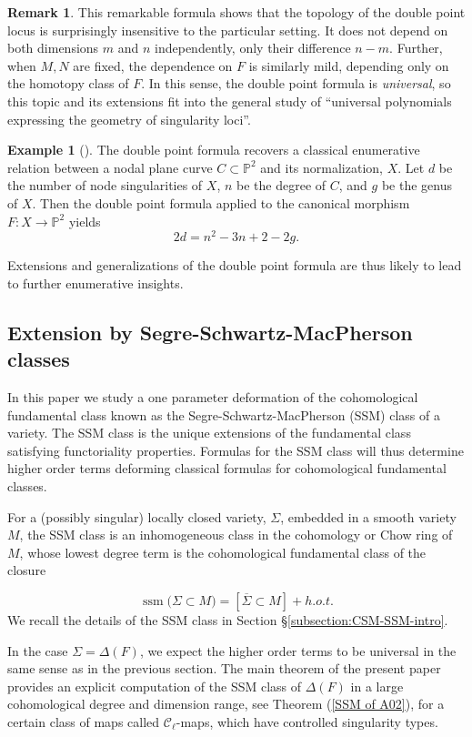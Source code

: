\documentclass[11pt]{article}
\theoremstyle{plain}
\theoremstyle{definition}
\newtheorem{example}[fact]{Example}
\newtheorem{remark}[fact]{Remark}
\theoremstyle{definition}
\newcommand{\bb}[1]{\mathbb{#1}}
\DeclareMathOperator{\ssm}{ssm}
\begin{document}
\begin{remark}
This remarkable formula shows that the topology of the double point locus is surprisingly insensitive to the particular setting. It does not depend on both dimensions $m$ and $n$ independently, only their difference $n-m$. Further, when $M,N$ are fixed, the dependence on $F$ is similarly mild, depending only on the homotopy class of $F$. In this sense, the double point formula is \textit{universal}, so this topic and its extensions fit into the general study of ``universal polynomials expressing the geometry of singularity loci''. 
\end{remark}

\begin{example}[\cite{FultonIT}]
The double point formula recovers a classical enumerative relation between a nodal plane curve $C \subset \bb P^2$ and its normalization, $X$. Let $d$ be the number of node singularities of $X$, $n$ be the degree of $C$, and $g$ be the genus of $X$. Then the double point formula applied to the canonical morphism  $F: X \to \bb P^2$ yields
\[
2d=n^2-3n+2-2g.
\]
\end{example}

Extensions and generalizations of the double point formula are thus likely to lead to further enumerative insights. 

\subsection{Extension by Segre-Schwartz-MacPherson classes}

In this paper we study a one parameter deformation of the cohomological fundamental class known as the Segre-Schwartz-MacPherson (SSM) class of a variety. The SSM class is the unique extensions of the fundamental class satisfying functoriality properties. Formulas for the SSM class will thus determine higher order terms deforming classical formulas for cohomological fundamental classes. 

For a (possibly singular) locally closed variety, $\Sigma$, embedded in a smooth variety $M$, the SSM class is an inhomogeneous class in the cohomology or Chow ring of $M$, whose lowest degree term is the cohomological fundamental class of the closure

\[
\ssm\big(\Sigma\subset M\big) = \left[\overline\Sigma\subset M\right] + h.o.t.
\]
We recall the details of the SSM class in Section \S\ref{subsection:CSM-SSM-intro}. 

In the case $\Sigma=\Delta(F)$, we expect the higher order terms to be universal in the same sense as in the previous section. The main theorem of the present paper provides an explicit computation of the SSM class of $\Delta(F)$ in a large cohomological degree and dimension range, see Theorem (\ref{SSM of A02}), for a certain class of maps called $\mathcal C_\ell$-maps, which have controlled singularity types.
\end{document}
